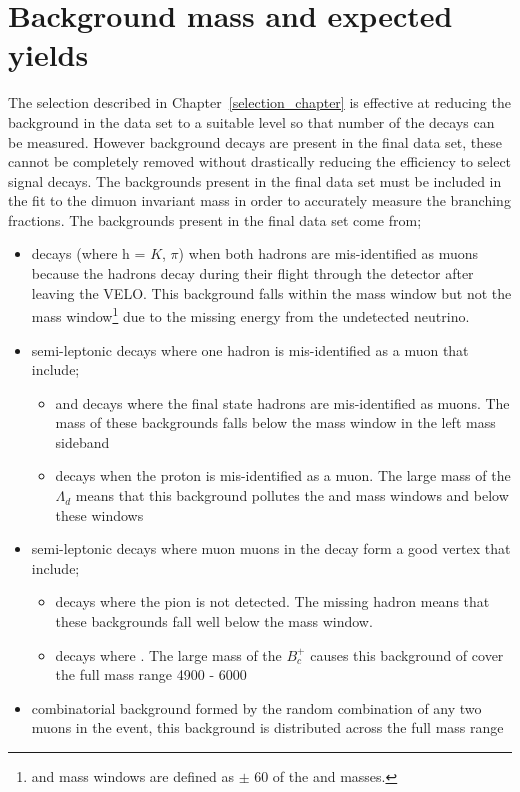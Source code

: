 \section{Background mass \pdfs and expected yields}
\label{sec:backgrounds}
The selection described in Chapter~\ref{selection_chapter} is effective at reducing the background in the data set to a suitable level so that number of the \bmumu decays can be measured. However background decays are present in the final data set, these cannot be completely removed without drastically reducing the efficiency to select signal decays. The backgrounds present in the final data set must be included in the fit to the dimuon invariant mass in order to accurately measure the \bmumu branching fractions. The backgrounds present in the final data set come from;
\begin{itemize}
\item \bhh decays (where h = $K$, $\pi$) when both hadrons are mis-identified as muons because the hadrons decay during their flight through the detector after leaving the VELO. This background falls within the \bd mass window but not the \bs mass window\footnote{\bd and \bs mass windows are defined as $\pm$ 60 \mevcc of the \bd and \bs masses.} due to the missing energy from the undetected neutrino. 
\item semi-leptonic decays where one hadron is mis-identified as a muon that include;
\begin{itemize}
\item \bdpimunu and \bsKmunu decays where the final state hadrons are mis-identified as muons. The mass of these backgrounds falls below the \bd mass window in the left mass sideband
\item \lambdab decays when the proton is mis-identified as a muon. The large mass of the $\Lambda_{d}$ means that this background pollutes the \bs and \bd mass windows and below these windows
\end{itemize}
\item semi-leptonic decays where muon muons in the decay form a good vertex that include;
\begin{itemize}
\item \bpimumu decays where the pion is not detected. The missing hadron means that these backgrounds fall well below the \bd mass window.
\item \bcjpsimunu decays where \jpsimumu. The large mass of the $B^{+}_{c}$ causes this background of cover the full mass range 4900 - 6000 \mevcc
\end{itemize}
\item combinatorial background formed by the random combination of any two muons in the event, this background is distributed across the full mass range
\end{itemize}

